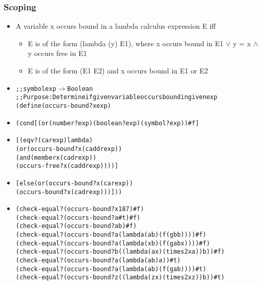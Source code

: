 \documentclass{beamer}
\newcommand{\arrow}{\(\rightarrow\)}
\newcommand{\quot}{\texttt{\textquotesingle{}}}
\begin{document}
\begin{frame}[fragile]
\frametitle{Scoping}
\begin{scriptsize}
\begin{itemize}
\item<1-> A variable x occurs bound in a lambda calculus expression E iff
\begin{itemize}
  \item E is of the form (lambda (y) E1), where x occurs bound in E1 $\vee$ y = x $\wedge$ y occurs free in E1
  \item E is of the form (E1 E2) and x occurs bound in E1 or E2
\end{itemize}


\item<2->
\begin{alltt}
;; symbol exp \arrow{} Boolean
;; Purpose: Determine if given variable occurs bound in given exp
(define (occurs-bound? x exp)		
\end{alltt}

\item<4->
\begin{alltt}		
  (cond	[(or (number? exp) (boolean? exp) (symbol? exp)) #f]
\end{alltt}

\item<5->
\begin{alltt}
        [(eqv? (car exp) \quot{}lambda)
         (or (occurs-bound? x (caddr exp))
             (and (member x (cadr exp))
                  (occurs-free? x (caddr exp))))]
\end{alltt}

\item<6->
\begin{alltt}
        [else (or (occurs-bound? x (car exp))
                  (occurs-bound? x (cadr exp)))]))
\end{alltt}

\item<3->
\begin{alltt}
(check-equal? (occurs-bound? \quot{}x 187) #f)
(check-equal? (occurs-bound? \quot{}a #t) #f)
(check-equal? (occurs-bound? \quot{}a \quot{}b) #f)
(check-equal? (occurs-bound? \quot{}a \quot{}(lambda (a b) (f (g b b)))) #f)
(check-equal? (occurs-bound? \quot{}a \quot{}(lambda (x b) (f (g a b x)))) #f)
(check-equal? (occurs-bound? \quot{}b \quot{}((lambda (a x) (times 2 x a)) b)) #f)
(check-equal? (occurs-bound? \quot{}a \quot{}(lambda (a b) a)) #t)
(check-equal? (occurs-bound? \quot{}a \quot{}(lambda (a b) (f (g a b)))) #t)
(check-equal? (occurs-bound? \quot{}z \quot{}((lambda (z x) (times 2 x z)) b)) #t)
\end{alltt}

\end{itemize}
\end{scriptsize}
\end{frame}
\end{document}
